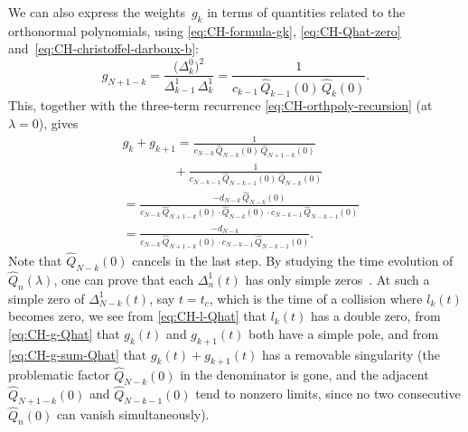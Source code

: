 \documentclass[10pt,a4paper]{article} \pdfoutput=1 
\begin{document}
We can also express the weights~$g_k$ in terms of quantities related to the orthonormal polynomials,
using \eqref{eq:CH-formula-gk}, \eqref{eq:CH-Qhat-zero} and~\eqref{eq:CH-christoffel-darboux-b}:
\begin{equation}
  \label{eq:CH-g-Qhat}
  g_{N+1-k} = \frac{\bigl( \Delta_{k}^0 \bigr)^2}{\Delta_{k-1}^1 \, \Delta_{k}^1}
  = \frac{1}{c_{k-1} \, \widehat Q_{k-1}(0) \, \widehat Q_{k}(0)}
  .
\end{equation}
This, together with the three-term recurrence \eqref{eq:CH-orthpoly-recursion} (at $\lambda=0$), gives
\begin{equation}
  \label{eq:CH-g-sum-Qhat}
  \begin{split}
    &
    g_k + g_{k+1}
    = \frac{1}{c_{N-k} \, \widehat Q_{N-k}(0) \, \widehat Q_{N+1-k}(0)}
    \\ & \qquad\qquad
    + \frac{1}{c_{N-k-1} \, \widehat Q_{N-k-1}(0) \, \widehat Q_{N-k}(0)}
    \\ &
    = \frac{- d_{N-k} \, \widehat Q_{N-k}(0)}{c_{N-k} \, \widehat Q_{N+1-k}(0) \cdot \widehat Q_{N-k}(0) \cdot c_{N-k-1} \, \widehat Q_{N-k-1}(0)}
    \\ &
    = \frac{- d_{N-k}}{c_{N-k} \, \widehat Q_{N+1-k}(0) \cdot c_{N-k-1} \, \widehat Q_{N-k-1}(0)}
    .
  \end{split}
\end{equation}
Note that $\widehat Q_{N-k}(0)$ cancels in the last step.
By studying the time evolution of $\widehat Q_n(\lambda)$,
one can prove that each $\Delta^1_n(t)$ has only simple zeros~\cite{beals-sattinger-szmigielski:2000:moment}.
At such a simple zero of $\Delta^1_{N-k}(t)$,
say $t=t_c$,
which is the time of a collision where $l_k(t)$ becomes zero,
we see from \eqref{eq:CH-l-Qhat} that $l_k(t)$ has a double zero,
from \eqref{eq:CH-g-Qhat} that $g_k(t)$ and $g_{k+1}(t)$ both have a simple pole,
and from \eqref{eq:CH-g-sum-Qhat} that $g_k(t) + g_{k+1}(t)$ has a removable singularity
(the problematic factor $\widehat Q_{N-k}(0)$ in the denominator is gone,
and the adjacent $\widehat Q_{N+1-k}(0)$ and $\widehat Q_{N-k-1}(0)$
tend to nonzero limits, since no two consecutive $\widehat Q_n(0)$ can vanish simultaneously).
\end{document}
